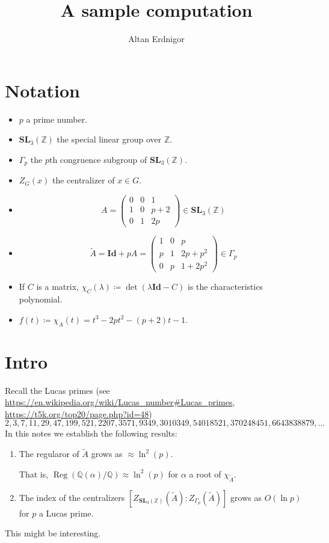 \documentclass[a4paper]{article}
\DeclareMathOperator{\assign}{\coloneqq}        %
\newcommand{\Q}{\mathbb{Q}}        %
\newcommand{\Id}{\mathbf{Id}}        %
\newcommand{\SL}{\mathbf{SL}_3(\mathbb{Z})}        %
\newcommand{\SLp}{\Gamma_p}        %
\DeclareMathOperator{\Reg}{Reg}        %
\begin{document}
\title{A sample computation}	
\author{Altan Erdnigor}
\maketitle

\tableofcontents

\section{Notation}
\begin{itemize}
\item $p$ a prime number.
\item $\SL$ the special linear group over $\mathbb{Z}$.
\item $\SLp$ the $p$th congruence subgroup of $\SL$.
\item $Z_G(x)$ the centralizer of $x \in G$.
\item 
\begin{equation}
\label{matrix_small}
A = 
\begin{pmatrix}
0 & 0 & 1 \\
1 & 0 & p+2 \\
0 & 1 & 2p
\end{pmatrix}
\in \SL
\end{equation}
\item 
\begin{equation}
\label{matrix_big}
\tilde A = \Id + p A =
\begin{pmatrix}
1 & 0 & p \\
p & 1 & 2 p + p^2 \\
0 & p & 1 + 2 p^2
\end{pmatrix}
\in \SLp
\end{equation}

\item If $C$ is a matrix, $\chi_C(\lambda) \assign \det(\lambda \Id - C)$ is the characteristics polynomial.
\item $ f(t) \assign \chi_A(t) = t^3 - 2p t^2 - (p + 2) t - 1$.

\end{itemize}

\section{Intro}
Recall the Lucas primes (see \url{https://en.wikipedia.org/wiki/Lucas_number#Lucas_primes}, \url{https://t5k.org/top20/page.php?id=48})
\begin{equation}
	\label{the_primes_sequence}
2, 3, 7, 11, 29, 47, 199, 521, 2207, 3571, 9349, 3010349, 54018521, 370248451, 6643838879, \ldots
\end{equation}
In this notes we establish the following results:
\begin{enumerate}
\item
The regularor of $\tilde A$
grows as $\approx \ln^2(p)$. 

That is, $\Reg ( \Q(\alpha)/\Q ) \approx \ln^2(p) $ for $\alpha$ a root of $\chi_{\tilde A}$.

\item
The index of the centralizers
$ [Z_{\SL}(\tilde A) : Z_{\SLp}(\tilde A)] $
grows as $O(\ln p)$ for $p$ a Lucas prime.
\end{enumerate}
This might be interesting.
\end{document}
